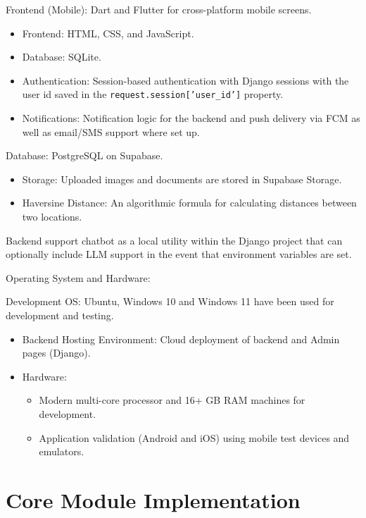 Frontend (Mobile): Dart and Flutter for cross-platform mobile screens.
\begin{itemize}
    \item Frontend: HTML, CSS, and JavaScript.
    \item Database: SQLite.
    \item Authentication: Session-based authentication with Django sessions with the user id saved in the \texttt{request.session['user\_id']} property.
    \item Notifications: Notification logic for the backend and push delivery via FCM as well as email/SMS support where set up.
\end{itemize}
Database: PostgreSQL on Supabase.
\begin{itemize}
    \item Storage: Uploaded images and documents are stored in Supabase Storage.
    \item Haversine Distance: An algorithmic formula for calculating distances between two locations.
\end{itemize}

Backend support chatbot as a local utility within the Django project that can optionally include LLM support in the event that environment variables are set.

Operating System and Hardware:

Development OS: Ubuntu, Windows 10 and Windows 11 have been used for development and testing.
\begin{itemize}
    \item Backend Hosting Environment: Cloud deployment of backend and Admin pages (Django).
    \item Hardware:
        \begin{itemize}
            \item Modern multi-core processor and 16+ GB RAM machines for development.
            \item Application validation (Android and iOS) using mobile test devices and emulators.
        \end{itemize}
\end{itemize}


\section{Core Module Implementation}

